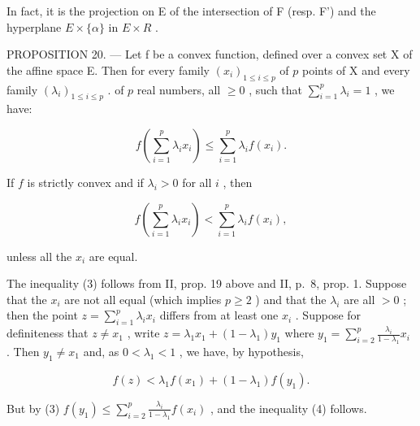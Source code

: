 In fact, it is the projection on E of the intersection of F (resp. F') and the hyperplane \(E \times \{\alpha\}\) in \(E \times R\) .

PROPOSITION 20. --- Let f be a convex function, defined over a convex set X of the affine space E. Then for every family \((x_{i})_{1\leqslant i\leqslant p}\) of \(p\) points of X and every family \((\lambda_{i})_{1\leqslant i\leqslant p}\) . of \(p\) real numbers, all \(\geqslant 0\) , such that \(\sum_{i = 1}^{p}\lambda_{i} = 1\) , we have:

\[
f \left(\sum_ {i = 1} ^ {p} \lambda_ {i} x _ {i}\right) \leqslant \sum_ {i = 1} ^ {p} \lambda_ {i} f \left(x _ {i}\right).\tag{3}
\]

If \(f\) is strictly convex and if \(\lambda_i > 0\) for all \(i\) , then

\[
f \left(\sum_ {i = 1} ^ {p} \lambda_ {i} x _ {i}\right) <   \sum_ {i = 1} ^ {p} \lambda_ {i} f \left(x _ {i}\right),\tag{4}
\]

unless all the \(x_{i}\) are equal.

The inequality (3) follows from II, prop. 19 above and II, p.~8, prop. 1. Suppose that the \(x_{i}\) are not all equal (which implies \(p \geqslant 2\) ) and that the \(\lambda_{i}\) are all \(>0\) ; then the point \(z = \sum_{i=1}^{p} \lambda_{i} x_{i}\) differs from at least one \(x_{i}\) . Suppose for definiteness that \(z \neq x_{1}\) , write \(z = \lambda_{1} x_{1} + (1 - \lambda_{1}) y_{1}\) where \(y_{1} = \sum_{i=2}^{p} \frac{\lambda_{i}}{1 - \lambda_{1}} x_{i}\) . Then \(y_{1} \neq x_{1}\) and, as \(0 < \lambda_{1} < 1\) , we have, by hypothesis,

\[
f (z) <   \lambda_ {1} f (x _ {1}) + (1 - \lambda_ {1}) f (y _ {1}).
\]

But by (3) \(f(y_{1}) \leqslant \sum_{i=2}^{p} \frac{\lambda_{i}}{1 - \lambda_{1}} f(x_{i})\) , and the inequality (4) follows.

